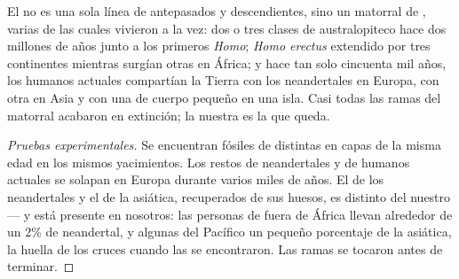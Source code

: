 \begin{proposition}\label{prop:g12:human-evolution:bush}
El  no es una sola línea de antepasados y descendientes,
sino un matorral de , varias de las cuales vivieron a la vez:
dos o tres clases de australopiteco hace dos millones de años junto a
los primeros \emph{Homo}; \emph{Homo erectus} extendido por tres
continentes mientras surgían otras  en África; y hace tan solo
cincuenta mil años, los humanos actuales compartían la Tierra con los
neandertales en Europa, con otra  en Asia y con una  de
cuerpo pequeño en una isla. Casi todas las ramas del matorral acabaron
en extinción; la nuestra es la que queda.
\end{proposition}
\begin{proof}[Pruebas experimentales]
Se encuentran fósiles de  distintas en capas de la misma edad
en los mismos yacimientos. Los restos de neandertales y de humanos
actuales se solapan en Europa durante varios miles de años. El  de
los neandertales y el de la  asiática, recuperados de sus
huesos, es distinto del nuestro --- y está presente en nosotros: las
personas de fuera de África llevan alrededor de un 2\% de 
neandertal, y algunas  del Pacífico un pequeño porcentaje de
la  asiática, la huella de los cruces cuando las  se
encontraron. Las ramas se tocaron antes de terminar.
\end{proof}

